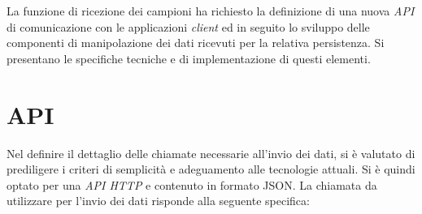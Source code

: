 La funzione di ricezione dei campioni ha richiesto la definizione di una nuova \emph{API} di comunicazione con le applicazioni \emph{client} ed in seguito lo sviluppo delle componenti di manipolazione dei dati ricevuti per la relativa persistenza. Si presentano le specifiche tecniche e di implementazione di questi elementi.

\section{API}
Nel definire il dettaglio delle chiamate necessarie all'invio dei dati, si è valutato di prediligere i criteri di semplicità e adeguamento alle tecnologie attuali. Si è quindi optato per una \emph{API HTTP} e contenuto in formato JSON. La chiamata da utilizzare per l'invio dei dati risponde alla seguente specifica:

